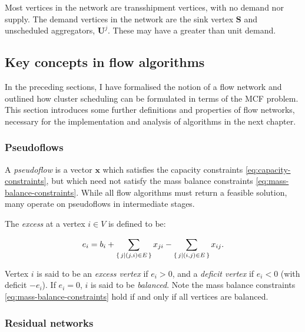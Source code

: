 \begin{remark}
Most vertices in the network are transshipment vertices, with no demand nor supply. The demand vertices in the network are the sink vertex $\mathbf{S}$ and unscheduled aggregators, $\mathbf{U}^j$. These may have a greater than unit demand.
\end{remark}

\subsection{Key concepts in flow algorithms}


In the preceding sections, I have formalised the notion of a flow network and outlined how cluster scheduling can be formulated in terms of the MCF problem. This section introduces some further definitions and properties of flow networks, necessary for the implementation and analysis of algorithms in the next chapter.

\subsubsection{Pseudoflows} \label{sec:prep-flow-pseudo}


A \emph{pseudoflow} is a vector $\mathbf{x}$ which satisfies the capacity constraints
\cref{eq:capacity-constraints}, but which need not satisfy the mass balance constraints \cref{eq:mass-balance-constraints}. While all flow algorithms must return a feasible solution, many operate on pseudoflows in intermediate stages. 

The \emph{excess} at a vertex $i\in V$ is defined to be:

\begin{equation}
e_i=b_i+\sum_{\set{j | (j,i)\in E}}x_{ji}-\sum_{\set{j | (i,j)\in E}}x_{ij}.
\end{equation}

Vertex $i$ is said to be an \emph{excess vertex} if $e_{i}>0$, and a \emph{deficit vertex} if $e_{i}<0$ (with deficit $-e_{i}$). If $e_{i}=0$, $i$ is said to be \emph{balanced}. Note the mass balance constraints \cref{eq:mass-balance-constraints} hold if and only if all vertices are balanced.

\subsubsection{Residual networks}


